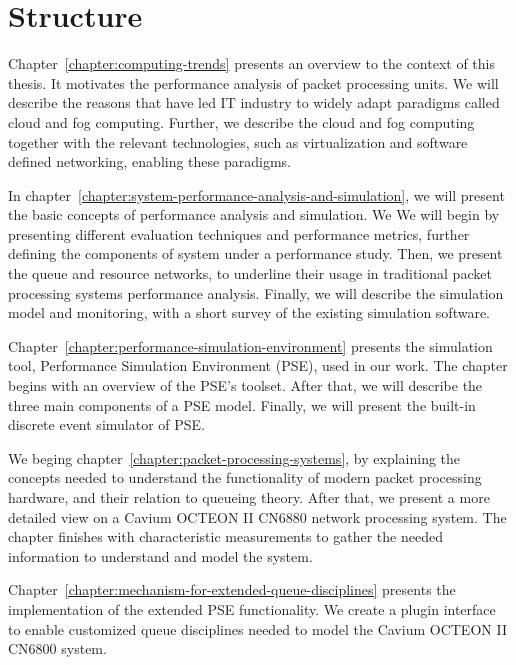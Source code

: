 
\section{Structure}
Chapter~\ref{chapter:computing-trends} presents an overview to the context of this thesis. It motivates the performance analysis of packet processing units. We will describe the reasons that have led IT industry to widely adapt paradigms called cloud and fog computing. Further, we describe the cloud and fog computing together with the relevant technologies, such as virtualization and software defined networking, enabling these paradigms.


In chapter~\ref{chapter:system-performance-analysis-and-simulation}, we will present the basic concepts of performance analysis and simulation. We We will begin by presenting different evaluation techniques and performance metrics, further defining the components of system under a performance study. Then, we present the queue and resource networks, to underline their usage in traditional packet processing systems performance analysis. Finally, we will describe the simulation model and monitoring, with a short survey of the existing simulation software.

Chapter~\ref{chapter:performance-simulation-environment} presents the simulation tool, Performance Simulation Environment (PSE), used in our work. The chapter begins with an overview of the PSE's toolset. After that, we will describe the three main components of a PSE model. Finally, we will present the built-in discrete event simulator of PSE.

We beging chapter~\ref{chapter:packet-processing-systems}, by explaining the concepts needed to understand the functionality of modern packet processing hardware, and their relation to queueing theory. After that, we present a  more detailed view on a Cavium OCTEON II CN6880 network processing system. The chapter finishes with characteristic measurements to gather the needed information to understand and model the system.

Chapter~\ref{chapter:mechanism-for-extended-queue-disciplines} presents the implementation of the extended PSE functionality. We create a plugin interface to enable customized queue disciplines needed to model the Cavium OCTEON II CN6800 system.

